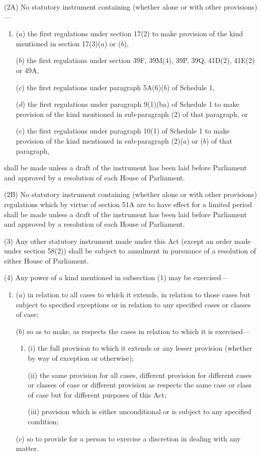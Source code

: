 \documentclass[a4paper]{article}
\begin{document}
(2A) No statutory instrument containing (whether alone or with other provisions)---
\begin{enumerate}\item[]
($a$) the first regulations under section 17(2) to make provision of the kind
mentioned in section 17(3)($a$) or ($b$),

($b$) the first regulations under section 39F, 39M(4), 39P, 39Q, 41D(2), 41E(2) or
49A,

($c$) the first regulations under paragraph 5A(6)($b$) of Schedule 1,

($d$) the first regulations under paragraph 9(1)(ba) of Schedule 1 to make provision
of the kind mentioned in sub-paragraph (2) of that paragraph, or

($e$) the first regulations under paragraph 10(1) of Schedule 1 to make provision
of the kind mentioned in sub-paragraph (2)($a$) or ($b$) of that paragraph,
\end{enumerate}
shall be made unless a draft of the instrument has been laid before Parliament and approved by a resolution of each House of Parliament.

(2B) No statutory instrument containing (whether alone or with other provisions) regulations which by virtue of section 51A are to have effect for a limited period shall be made unless a draft of the instrument has been laid before Parliament and approved by a resolution of each House of Parliament.

(3) Any other statutory instrument made under this Act (except an order made under section 58(2)) shall be subject to annulment in pursuance of a resolution of either House of Parliament.

(4) Any power of a kind mentioned in subsection (1) may be exercised---
\begin{enumerate}\item[]
($a$) in relation to all cases to which it extends, in relation to those cases but
subject to specified exceptions or in relation to any specified cases or
classes of case;

($b$) so as to make, as respects the cases in relation to which it is exercised---
\begin{enumerate}\item[]
(i)
the full provision to which it extends or any lesser provision
(whether by way of exception or otherwise);

(ii)
the same provision for all cases, different provision for different
cases or classes of case or different provision as respects the same
case or class of case but for different purposes of this Act;

(iii) provision which is either unconditional or is subject to any specified
condition;
\end{enumerate}

($c$) so to provide for a person to exercise a discretion in dealing with any
matter.
\end{enumerate}
\end{document}
